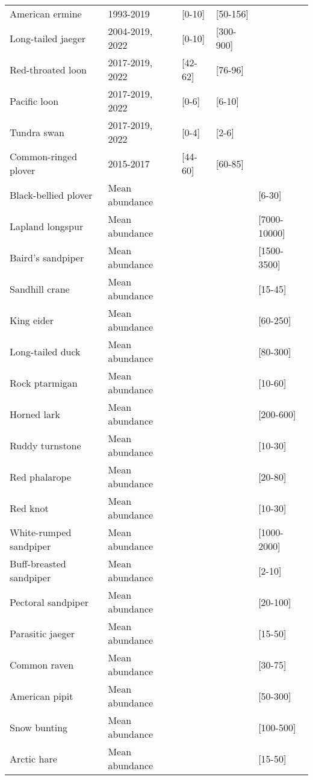 \begin{table}[ht]
\begin{tabularx}{\textwidth}{lllll}
  American ermine & 1993-2019 & [0-10] & [50-156] &  \\ 
  Long-tailed jaeger & 2004-2019, 2022 & [0-10] & [300-900] &  \\ 
  Red-throated loon & 2017-2019, 2022 & [42-62] & [76-96] &  \\ 
  Pacific loon & 2017-2019, 2022 & [0-6] & [6-10] &  \\ 
  Tundra swan & 2017-2019, 2022 & [0-4] & [2-6] &  \\ 
  Common-ringed plover & 2015-2017 & [44-60] & [60-85] &  \\ 
  Black-bellied plover & Mean abundance &  &  & [6-30] \\ 
  Lapland longspur & Mean abundance &  &  & [7000-10000] \\ 
  Baird's sandpiper & Mean abundance &  &  & [1500-3500] \\ 
  Sandhill crane & Mean abundance &  &  & [15-45] \\ 
  King eider & Mean abundance &  &  & [60-250] \\ 
  Long-tailed duck & Mean abundance &  &  & [80-300] \\ 
  Rock ptarmigan & Mean abundance &  &  & [10-60] \\ 
  Horned lark & Mean abundance &  &  & [200-600] \\ 
  Ruddy turnstone & Mean abundance &  &  & [10-30] \\ 
  Red phalarope & Mean abundance &  &  & [20-80] \\ 
  Red knot & Mean abundance &  &  & [10-30] \\ 
  White-rumped sandpiper & Mean abundance &  &  & [1000-2000] \\ 
  Buff-breasted sandpiper & Mean abundance &  &  & [2-10] \\ 
  Pectoral sandpiper & Mean abundance &  &  & [20-100] \\ 
  Parasitic jaeger & Mean abundance &  &  & [15-50] \\ 
  Common raven & Mean abundance &  &  & [30-75] \\ 
  American pipit & Mean abundance &  &  & [50-300] \\ 
  Snow bunting & Mean abundance &  &  & [100-500] \\ 
  Arctic hare & Mean abundance &  &  & [15-50] \\ 
   \hline
\end{tabularx}
\endgroup
\end{table}
